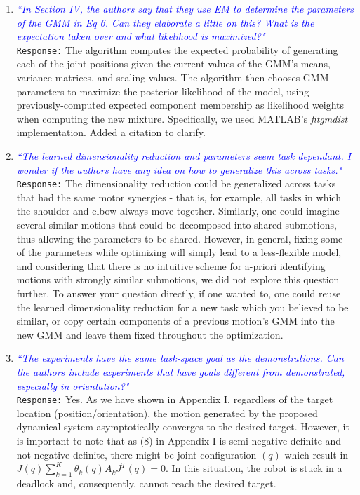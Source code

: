 \documentclass{article}
\begin{document}
\begin{enumerate}
\item \textcolor{blue}{\textit{``In Section IV, the authors say that they use EM to determine the parameters of the GMM in Eq 6. Can
they elaborate a little on this? What is the expectation taken over and what likelihood is maximized?"}}\\
\texttt{Response:} \small The algorithm computes the expected probability of generating each of the joint positions given the current values of the GMM's means, variance matrices, and scaling values. The algorithm then chooses GMM parameters to maximize the posterior likelihood of the model, using previously-computed expected component membership as likelihood weights when computing the new mixture. Specifically, we used MATLAB's \textit{fitgmdist} implementation. Added a citation to clarify.\\

\item \textcolor{blue}{\textit{``The learned dimensionality reduction and parameters seem task dependant. I wonder if the authors
have any idea on how to generalize this across tasks."}}\\
\texttt{Response:} \small The dimensionality reduction could be generalized across tasks that had the same motor synergies - that is, for example, all tasks in which the shoulder and elbow always move together. Similarly, one could imagine several similar motions that could be decomposed into shared submotions, thus allowing the parameters to be shared. However, in general, fixing some of the parameters while optimizing will simply lead to a less-flexible model, and considering that there is no intuitive scheme for a-priori identifying motions with strongly similar submotions, we did not explore this question further. To answer your question directly, if one wanted to, one could reuse the learned dimensionality reduction for a new task which you believed to be similar, or copy certain components of a previous motion's GMM into the new GMM and leave them fixed throughout the optimization.\\

\item \textcolor{blue}{\textit{``The experiments have the same task-space goal as the
demonstrations. Can the authors include experiments that have goals
different from demonstrated, especially in orientation?"}}\\
\texttt{Response:} \small Yes. As we have shown in Appendix I, regardless of the target location (position/orientation), the motion generated by the proposed dynamical system asymptotically converges to the desired target. However, it is important to note that as (8) in Appendix I is semi-negative-definite and not negative-definite, there might be joint configuration $ (q )$ which result in $ J(q)\sum\limits_{k=1}^{K}\theta_k(q)A_kJ^T(q)=0 $. In this situation, the robot is stuck in a deadlock and, consequently, cannot reach the desired target. 


\end{enumerate}
\end{document}
